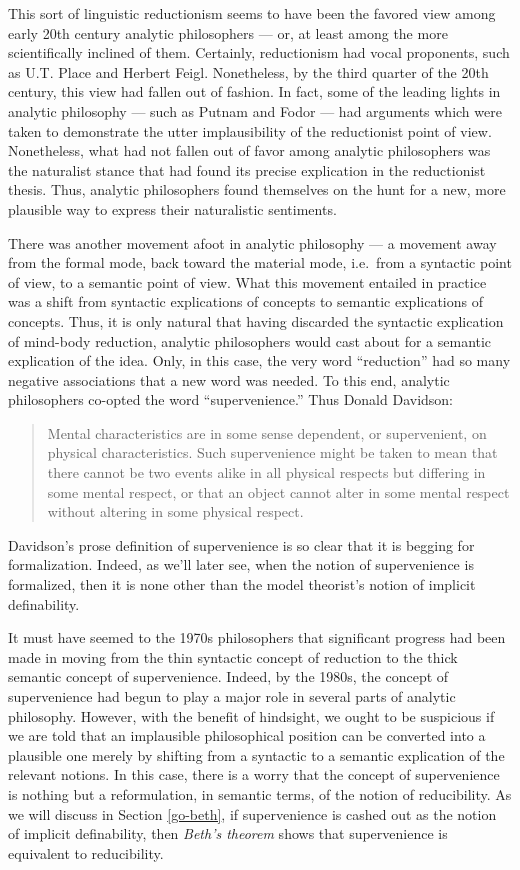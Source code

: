 This sort of linguistic reductionism seems to have been the favored
view among early 20th century analytic philosophers --- or, at least
among the more scientifically inclined of them.  Certainly,
reductionism had vocal proponents, such as U.T. Place and Herbert
Feigl.  Nonetheless, by the third quarter of the 20th century, this
view had fallen out of fashion.  In fact, some of the leading lights
in analytic philosophy --- such as Putnam and Fodor --- had arguments
which were taken to demonstrate the utter implausibility of the
reductionist point of view.  Nonetheless, what had not fallen out of
favor among analytic philosophers was the naturalist stance that had
found its precise explication in the reductionist thesis.  Thus,
analytic philosophers found themselves on the hunt for a new, more
plausible way to express their naturalistic sentiments.

There was another movement afoot in analytic philosophy --- a movement
away from the formal mode, back toward the material mode, i.e.\ from a
syntactic point of view, to a semantic point of view.  What this
movement entailed in practice was a shift from syntactic explications
of concepts to semantic explications of concepts.  Thus, it is only
natural that having discarded the syntactic explication of mind-body
reduction, analytic philosophers would cast about for a semantic
explication of the idea.  Only, in this case, the very word
``reduction'' had so many negative associations that a new word was
needed.  To this end, analytic philosophers co-opted the word
``supervenience.''  Thus Donald Davidson:
\begin{quote} Mental characteristics are in some sense dependent, or
  supervenient, on physical characteristics.  Such supervenience might
  be taken to mean that there cannot be two events alike in all
  physical respects but differing in some mental respect, or that an
  object cannot alter in some mental respect without altering in some
  physical respect. \citep{davidson} \end{quote} Davidson's prose
definition of supervenience is so clear that it is begging for
formalization.  Indeed, as we'll later see, when the notion of
supervenience is formalized, then it is none other than the model
theorist's notion of implicit definability.

It must have seemed to the 1970s philosophers that significant
progress had been made in moving from the thin syntactic concept of
reduction to the thick semantic concept of supervenience.  Indeed, by
the 1980s, the concept of supervenience had begun to play a major role
in several parts of analytic philosophy.  However, with the benefit of
hindsight, we ought to be suspicious if we are told that an
implausible philosophical position can be converted into a plausible
one merely by shifting from a syntactic to a semantic explication of
the relevant notions.  In this case, there is a worry that the concept
of supervenience is nothing but a reformulation, in semantic terms, of
the notion of reducibility.  As we will discuss in Section
\ref{go-beth}, if supervenience is cashed out as the notion of
implicit definability, then \emph{Beth's theorem} shows that
supervenience is equivalent to reducibility.

